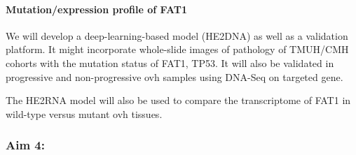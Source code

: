 \documentclass[12pt, a4paper]{article}
\begin{document}
\clearpage



\paragraph{Mutation/expression profile of FAT1} %




We will develop a deep-learning-based model (HE2DNA) as well as a validation platform. 
It might incorporate whole-slide images of pathology of TMUH/CMH cohorts with the mutation status of FAT1, TP53.
It will also be validated in progressive and non-progressive \acrshort{ovh} samples using DNA-Seq on targeted gene.

The HE2RNA model will also be used to compare the transcriptome of FAT1 in wild-type versus mutant \acrshort{ovh} tissues.








\clearpage
\subsubsection*{Aim 4:}\\[0.5cm]
\end{document}
